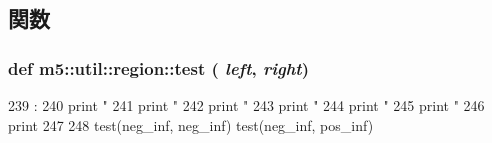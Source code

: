 \subsection{関数}
\hypertarget{namespacem5_1_1util_1_1region_aa2760b1165ecae2e04eb2e661ba1841d}{
\subsubsection[{test}]{\setlength{\rightskip}{0pt plus 5cm}def m5::util::region::test ( {\em left}, \/   {\em right})}}
\label{namespacem5_1_1util_1_1region_aa2760b1165ecae2e04eb2e661ba1841d}



\begin{DoxyCode}
239                          :
240         print "%
241         print "%
242         print "%
243         print "%
244         print "%
245         print "%
246         print
247 
248     test(neg_inf, neg_inf)
    test(neg_inf, pos_inf)
\end{DoxyCode}


